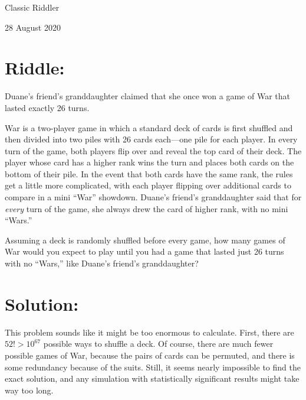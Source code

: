 \documentclass{article}
\begin{document}
\pagestyle{empty} %

\begin{center}
{\LARGE Classic Riddler}

\vspace{0.15in}

{\Large 28 August 2020}
\end{center}


\section*{Riddle:}

Duane's friend's granddaughter claimed that she once won a game of War that lasted exactly 26 turns.

War is a two-player game in which a standard deck of cards is first shuffled and then divided into two piles with 26 cards each---one pile for each player.
In every turn of the game, both players flip over and reveal the top card of their deck.
The player whose card has a higher rank wins the turn and places both cards on the bottom of their pile.
In the event that both cards have the same rank, the rules get a little more complicated, with each player flipping over additional cards to compare in a mini “War” showdown.
Duane's friend's granddaughter said that for \textit{every} turn of the game, she always drew the card of higher rank, with no mini “Wars.”

Assuming a deck is randomly shuffled before every game, how many games of War would you expect to play until you had a game that lasted just 26 turns with no “Wars,” like Duane's friend's granddaughter?

\section*{Solution:}

This problem sounds like it might be too enormous to calculate.
First, there are $52!>10^{67}$ possible ways to shuffle a deck.
Of course, there are much fewer possible games of War, because the pairs of cards can be permuted, and there is some redundancy because of the suits.
Still, it seems nearly impossible to find the exact solution, and any simulation with statistically significant results might take way too long.
\end{document}
